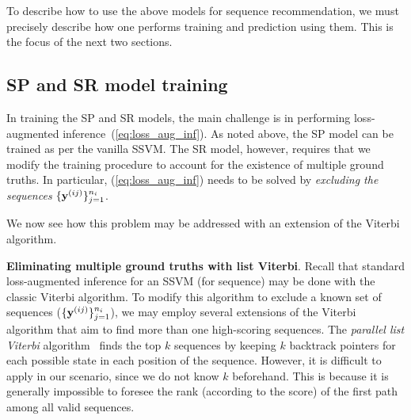 To describe how to use the above models for sequence recommendation, we must precisely describe how one performs training and prediction using them.
This is the focus of the next two sections.


%
\subsection{SP and SR model training}
\label{ssec:training}

In training the SP and SR models, the main challenge is in performing loss-augmented inference~(\ref{eq:loss_aug_inf}).
As noted above, the SP model can be trained as per the vanilla SSVM.
The SR model, however, requires that we modify the training procedure to account for the existence of multiple ground truths.
In particular, (\ref{eq:loss_aug_inf}) needs to be solved by \emph{excluding the sequences} $\{\mathbf{y}^{({ij})}\}_{j=1}^{n_i}$.


We now see how this problem may be addressed with an extension of the Viterbi algorithm.


%
\textbf{Eliminating multiple ground truths with list Viterbi}.
Recall that standard loss-augmented inference for an SSVM (for sequence) may be done with the classic Viterbi algorithm.
To modify this algorithm to exclude a known set of sequences (\ie $\{\mathbf{y}^{(ij)}\}_{j=1}^{n_i}$),
we may employ
several extensions of the Viterbi algorithm that aim to find more than one high-scoring sequences.
The \emph{parallel list Viterbi} algorithm~\cite{seshadri1994list} finds the top $k$ sequences
by keeping $k$ backtrack pointers for each possible state in each position of the sequence.
However, it is difficult to apply in our scenario,
since we do not know $k$ beforehand.
This is because it is generally impossible to foresee
the rank (according to the score) of the first path among all valid sequences. %

